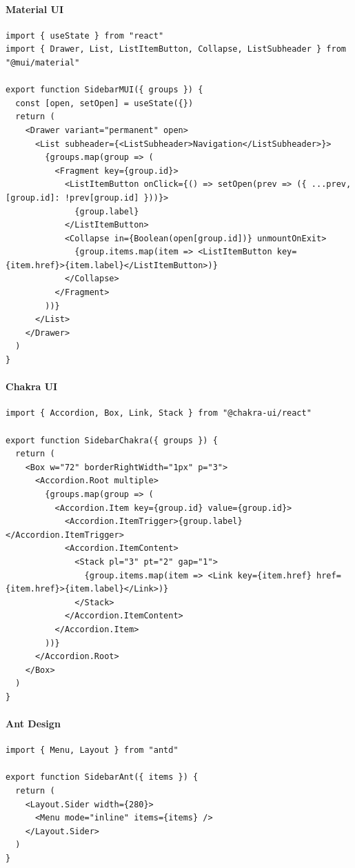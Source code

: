 \paragraph{Material UI}
\begin{verbatim}
import { useState } from "react"
import { Drawer, List, ListItemButton, Collapse, ListSubheader } from "@mui/material"

export function SidebarMUI({ groups }) {
  const [open, setOpen] = useState({})
  return (
    <Drawer variant="permanent" open>
      <List subheader={<ListSubheader>Navigation</ListSubheader>}>
        {groups.map(group => (
          <Fragment key={group.id}>
            <ListItemButton onClick={() => setOpen(prev => ({ ...prev, [group.id]: !prev[group.id] }))}>
              {group.label}
            </ListItemButton>
            <Collapse in={Boolean(open[group.id])} unmountOnExit>
              {group.items.map(item => <ListItemButton key={item.href}>{item.label}</ListItemButton>)}
            </Collapse>
          </Fragment>
        ))}
      </List>
    </Drawer>
  )
}
\end{verbatim}

\paragraph{Chakra UI}
\begin{verbatim}
import { Accordion, Box, Link, Stack } from "@chakra-ui/react"

export function SidebarChakra({ groups }) {
  return (
    <Box w="72" borderRightWidth="1px" p="3">
      <Accordion.Root multiple>
        {groups.map(group => (
          <Accordion.Item key={group.id} value={group.id}>
            <Accordion.ItemTrigger>{group.label}</Accordion.ItemTrigger>
            <Accordion.ItemContent>
              <Stack pl="3" pt="2" gap="1">
                {group.items.map(item => <Link key={item.href} href={item.href}>{item.label}</Link>)}
              </Stack>
            </Accordion.ItemContent>
          </Accordion.Item>
        ))}
      </Accordion.Root>
    </Box>
  )
}
\end{verbatim}

\paragraph{Ant Design}
\begin{verbatim}
import { Menu, Layout } from "antd"

export function SidebarAnt({ items }) {
  return (
    <Layout.Sider width={280}>
      <Menu mode="inline" items={items} />
    </Layout.Sider>
  )
}
\end{verbatim}

